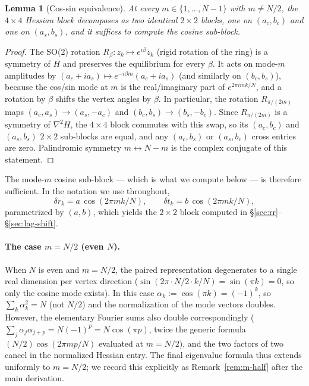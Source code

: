 \documentclass[11pt]{article}
\newtheorem{lemma}{Lemma}
\theoremstyle{remark}
\begin{document}
\begin{lemma}[Cos-sin equivalence]\label{lem:cos-sin}
At every $m \in \{1, \ldots, N-1\}$ with $m \ne N/2$, the
$4 \times 4$ Hessian block decomposes as two identical $2 \times 2$
blocks, one on $(a_c, b_c)$ and one on $(a_s, b_s)$, and it suffices
to compute the cosine sub-block.
\end{lemma}

\begin{proof}
The SO(2) rotation $R_\beta : z_k \mapsto e^{i\beta} z_k$ (rigid rotation
of the ring) is a symmetry of $H$ and preserves the equilibrium for
every $\beta$. It acts on mode-$m$ amplitudes by
$(a_c + i a_s) \mapsto e^{-i\beta m}(a_c + i a_s)$ (and similarly on
$(b_c, b_s)$), because the cos/sin mode at $m$ is the real/imaginary
part of $e^{2\pi i m k / N}$, and a rotation by $\beta$ shifts the
vertex angles by $\beta$. In particular, the rotation $R_{\pi/(2m)}$
maps $(a_c, a_s) \to (a_s, -a_c)$ and $(b_c, b_s) \to (b_s, -b_c)$.
Since $R_{\pi/(2m)}$ is a symmetry of $\nabla^2 H$, the $4 \times 4$
block commutes with this swap, so its $(a_c, b_c)$ and $(a_s, b_s)$
$2 \times 2$ sub-blocks are equal, and any $(a_c, b_s)$ or $(a_s, b_c)$
cross entries are zero. Palindromic symmetry $m \leftrightarrow N - m$
is the complex conjugate of this statement.
\end{proof}

The mode-$m$ cosine sub-block — which is what we compute below — is
therefore sufficient. In the notation we use throughout,
\begin{equation}\label{eq:cos-block}
  \delta r_k = a\,\cos(2\pi m k / N), \qquad
  \delta t_k = b\,\cos(2\pi m k / N),
\end{equation}
parametrized by $(a, b)$, which yields the $2 \times 2$ block
computed in \S\ref{sec:rr}--\S\ref{sec:lag-shift}.

\paragraph{The case $m = N/2$ (even $N$).}
When $N$ is even and $m = N/2$, the paired representation degenerates
to a single real dimension per vertex direction
($\sin(2\pi \cdot N/2 \cdot k / N) = \sin(\pi k) = 0$, so only the
cosine mode exists). In this case $\alpha_k := \cos(\pi k) = (-1)^k$,
so $\sum_k \alpha_k^2 = N$ (not $N/2$) and the normalization of the
mode vectors doubles. However, the elementary Fourier sums also
double correspondingly ($\sum_j \alpha_j \alpha_{j+p} = N (-1)^p
= N \cos(\pi p)$, twice the generic formula $(N/2) \cos(2\pi m p / N)$
evaluated at $m = N/2$), and the two factors of two cancel in the
normalized Hessian entry. The final eigenvalue formula thus extends
uniformly to $m = N/2$; we record this explicitly as
Remark~\ref{rem:m-half} after the main derivation.
\end{document}
